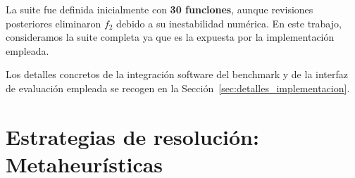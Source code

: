 La suite fue definida inicialmente con \textbf{30 funciones}, aunque revisiones posteriores eliminaron \(f_2\) debido a su inestabilidad numérica. En este trabajo, consideramos la suite completa ya que es la expuesta por la implementación empleada.



Los detalles concretos de la integración software del benchmark y de la
interfaz de evaluación empleada se recogen en la
Sección~\ref{sec:detalles_implementacion}.





% 


\section{Estrategias de resolución: Metaheurísticas}
\label{sec:metaheuristicas}


